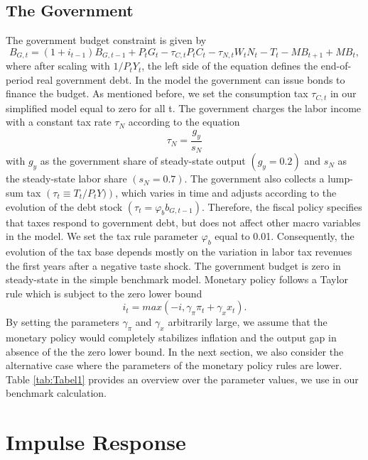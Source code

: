\documentclass[12pt,a4paper,oneside,titlepage]{article}
\begin{document}
\subsection*{The Government}

The government budget constraint is given by
\begin{equation}
B_{G,t} = \left(1 + i_{t-1}\right)B_{G,t-1} + P_tG_t - \tau_{C,t}P_tC_t - \tau_{N,t}W_tN_t - T_t - MB_{t+1} + MB_t,  \nonumber
\end{equation}
where after scaling with $1/ P_tY_t$, the left side of the equation defines the end-of-period real government debt. In the model the government can issue bonds to finance the budget. As mentioned before, we set the consumption tax $\tau_{C,t}$ in our simplified model equal to zero for all t. The government charges the labor income with a constant tax rate $\tau_N$ according to the equation \[\tau_N = \frac{g_y}{s_N}\] with $g_y$ as the government share of steady-state output $\left(g_y = 0.2 \right)$ and $s_N$ as the steady-state labor share $\left(s_N = 0.7\right)$.
The government also collects a lump-sum tax $\left(\tau_t \equiv T_t/P_tY)\right)$, which varies in time and adjusts according to the evolution of the debt stock $\left(\tau_t = \varphi_b b_{G,t-1}\right)$. Therefore, the fiscal policy specifies that taxes respond to government debt, but does not affect other macro variables in the model. We set the tax rule parameter $\varphi_b$ equal to 0.01. Consequently, the evolution of the tax base depends mostly on the variation in labor tax revenues the first years after a negative taste shock. The government budget is zero in steady-state in the simple benchmark model.\newline
Monetary policy follows a Taylor rule which is subject to the zero lower bound
\begin{equation}
i_t = max \left(-i, \gamma_{\pi} \pi_t + \gamma_x x_t\right)  \nonumber.
\end{equation}
By setting the parameters $\gamma_{\pi}$ and $\gamma_x$ arbitrarily large, we assume that the monetary policy would completely stabilizes inflation and the output gap in absence of the the zero lower bound. In the next section, we also consider the alternative case where the parameters of the monetary policy rules are lower.\newline
Table \ref{tab:Tabel1} provides an overview over the parameter values, we use in our benchmark calculation.
\bigskip


\section{Impulse Response}
\end{document}
